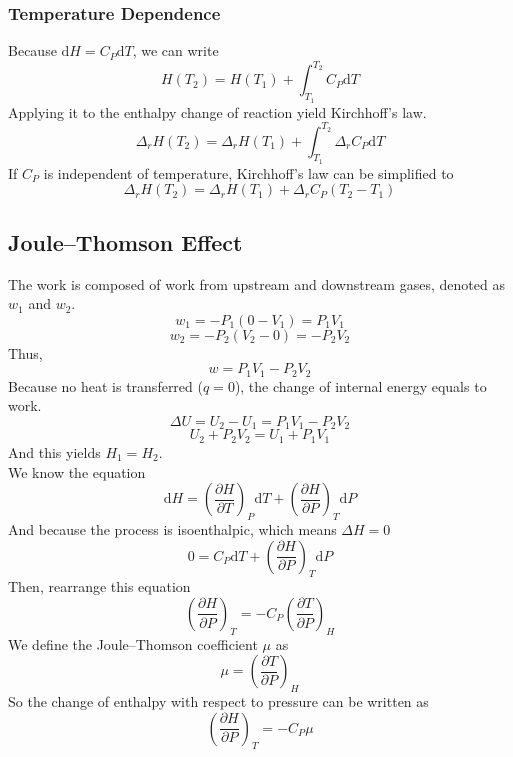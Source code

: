 \documentclass[letterpaper]{article}
\newcommand{\diff}{\mathrm{d}}
\begin{document}
\subsubsection*{Temperature Dependence}
Because $\diff H=C_P\diff T$, we can write
\begin{equation*}
    H(T_2)=H(T_1)+\int_{T_1}^{T_2}C_P\diff T
\end{equation*}
Applying it to the enthalpy change of reaction yield Kirchhoff’s law.
\begin{equation*}
    \Delta_rH(T_2)=\Delta_rH(T_1)+\int_{T_1}^{T_2}\Delta_rC_P\diff T
\end{equation*}
If $C_P$ is independent of temperature, Kirchhoff’s law can be simplified to
\begin{equation*}
    \Delta_rH(T_2)=\Delta_rH(T_1)+\Delta_rC_P(T_2-T_1)
\end{equation*}
\subsection*{Joule–Thomson Effect}
The work is composed of work from upstream and downstream gases, denoted as $w_1$ and $w_2$.
\begin{equation*}
    w_1=-P_1(0-V_1)=P_1V_1
\end{equation*}
\begin{equation*}
    w_2=-P_2(V_2-0)=-P_2V_2
\end{equation*}
Thus,
\begin{equation*}
    w=P_1V_1-P_2V_2
\end{equation*}
Because no heat is transferred ($q=0$), the change of internal energy equals to work.
\begin{equation*}
    \Delta U=U_2-U_1=P_1V_1-P_2V_2
\end{equation*}
\begin{equation*}
    U_2+P_2V_2=U_1+P_1V_1
\end{equation*}
And this yields $H_1=H_2$.\\
We know the equation
\begin{equation*}
    \diff H=(\frac{\partial H}{\partial T})_P\diff T+(\frac{\partial H}{\partial P})_T\diff P
\end{equation*}
And because the process is isoenthalpic, which means $\Delta H=0$
\begin{equation*}
    0=C_P\diff T+(\frac{\partial H}{\partial P})_T\diff P
\end{equation*}
Then, rearrange this equation
\begin{equation*}
    (\frac{\partial H}{\partial P})_T=-C_P(\frac{\partial T}{\partial P})_H
\end{equation*}
We define the Joule–Thomson coefficient $\mu$ as
\begin{equation*}
    \mu=(\frac{\partial T}{\partial P})_H
\end{equation*}
So the change of enthalpy with respect to pressure can be written as
\begin{equation*}
    \boxed{(\frac{\partial H}{\partial P})_T=-C_P\mu}
\end{equation*}
\end{document}

